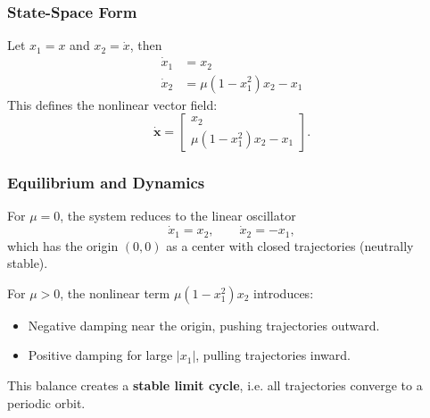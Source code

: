 \subsubsection*{State-Space Form}
Let $x_1 = x$ and $x_2 = \dot{x}$, then
\begin{align}
    \dot{x}_1 &= x_2 \\
    \dot{x}_2 &= \mu(1 - x_1^2)x_2 - x_1
\end{align}
This defines the nonlinear vector field:
\[
\dot{\mathbf{x}} =
\begin{bmatrix}
x_2 \\
\mu(1-x_1^2)x_2 - x_1
\end{bmatrix}.
\]

\subsubsection*{Equilibrium and Dynamics}
\begin{remark}
    For $\mu = 0$, the system reduces to the linear oscillator
    \begin{equation}
        \dot{x}_1 = x_2, \qquad \dot{x}_2 = -x_1,
    \end{equation}
    which has the origin $(0,0)$ as a center with closed trajectories (neutrally stable).
\end{remark}

\begin{remark}
    For $\mu > 0$, the nonlinear term $\mu(1-x_1^2)x_2$ introduces:
    \begin{itemize}
        \item Negative damping near the origin, pushing trajectories outward.
        \item Positive damping for large $|x_1|$, pulling trajectories inward.
    \end{itemize}
    This balance creates a \textbf{stable limit cycle}, i.e. all trajectories converge to a periodic orbit.
\end{remark}

